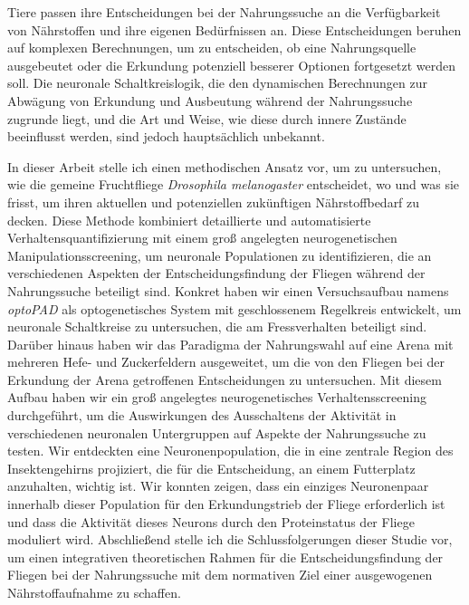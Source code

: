 
%

Tiere passen ihre Entscheidungen bei der Nahrungssuche an die Verfügbarkeit von Nährstoffen und ihre eigenen Bedürfnissen an. Diese Entscheidungen beruhen auf komplexen Berechnungen, um zu entscheiden, ob eine Nahrungsquelle ausgebeutet oder die Erkundung potenziell besserer Optionen fortgesetzt werden soll. Die neuronale Schaltkreislogik, die den dynamischen Berechnungen zur Abwägung von Erkundung und Ausbeutung während der Nahrungssuche zugrunde liegt, und die Art und Weise, wie diese durch innere Zustände beeinflusst werden, sind jedoch haupts\"achlich unbekannt.

\indent In dieser Arbeit stelle ich einen methodischen Ansatz vor, um zu untersuchen, wie die gemeine Fruchtfliege \textit{Drosophila melanogaster} entscheidet, wo und was sie frisst, um ihren aktuellen und potenziellen zukünftigen Nährstoffbedarf zu decken. Diese Methode kombiniert detaillierte und automatisierte Verhaltensquantifizierung mit einem groß angelegten neurogenetischen Manipulationsscreening, um neuronale Populationen zu identifizieren, die an verschiedenen Aspekten der Entscheidungsfindung der Fliegen während der Nahrungssuche beteiligt sind. Konkret haben wir einen Versuchsaufbau namens \textit{optoPAD} als optogenetisches System mit geschlossenem Regelkreis entwickelt, um neuronale Schaltkreise zu untersuchen, die am Fressverhalten beteiligt sind. Darüber hinaus haben wir das Paradigma der Nahrungswahl auf eine Arena mit mehreren Hefe- und Zuckerfeldern ausgeweitet, um die von den Fliegen bei der Erkundung der Arena getroffenen Entscheidungen zu untersuchen. Mit diesem Aufbau haben wir ein groß angelegtes neurogenetisches Verhaltensscreening durchgeführt, um die Auswirkungen des Ausschaltens der Aktivität in verschiedenen neuronalen Untergruppen auf Aspekte der Nahrungssuche zu testen. Wir entdeckten eine Neuronenpopulation, die in eine zentrale Region des Insektengehirns projiziert, die für die Entscheidung, an einem Futterplatz anzuhalten, wichtig ist. Wir konnten zeigen, dass ein einziges Neuronenpaar innerhalb dieser Population für den Erkundungstrieb der Fliege erforderlich ist und dass die Aktivität dieses Neurons durch den Proteinstatus der Fliege moduliert wird. Abschließend stelle ich die Schlussfolgerungen dieser Studie vor, um einen integrativen theoretischen Rahmen für die Entscheidungsfindung der Fliegen bei der Nahrungssuche mit dem normativen Ziel einer ausgewogenen Nährstoffaufnahme zu schaffen.

